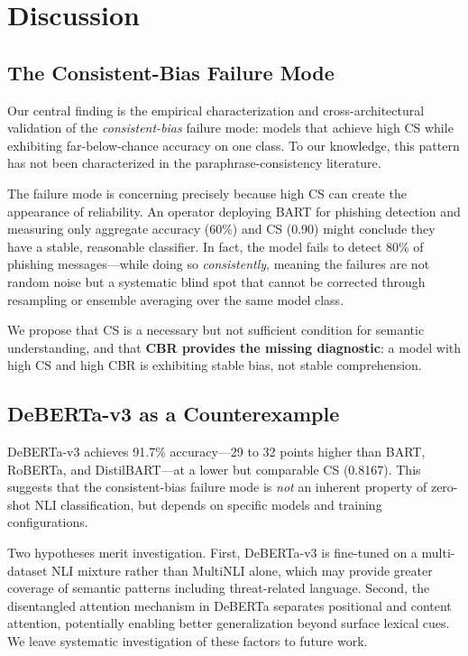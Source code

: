 \documentclass[11pt]{article}
\begin{document}
\section{Discussion}

\subsection{The Consistent-Bias Failure Mode}

Our central finding is the empirical characterization and cross-architectural validation of the \textit{consistent-bias} failure mode: models that achieve high CS while exhibiting far-below-chance accuracy on one class. To our knowledge, this pattern has not been characterized in the paraphrase-consistency literature.

The failure mode is concerning precisely because high CS can create the appearance of reliability. An operator deploying BART for phishing detection and measuring only aggregate accuracy (60\%) and CS (0.90) might conclude they have a stable, reasonable classifier. In fact, the model fails to detect 80\% of phishing messages---while doing so \textit{consistently}, meaning the failures are not random noise but a systematic blind spot that cannot be corrected through resampling or ensemble averaging over the same model class.

We propose that CS is a necessary but not sufficient condition for semantic understanding, and that \textbf{CBR provides the missing diagnostic}: a model with high CS and high CBR is exhibiting stable bias, not stable comprehension.

\subsection{DeBERTa-v3 as a Counterexample}

DeBERTa-v3 achieves 91.7\% accuracy---29 to 32 points higher than BART, RoBERTa, and DistilBART---at a lower but comparable CS (0.8167). This suggests that the consistent-bias failure mode is \textit{not} an inherent property of zero-shot NLI classification, but depends on specific models and training configurations. 

Two hypotheses merit investigation. First, DeBERTa-v3 is fine-tuned on a multi-dataset NLI mixture rather than MultiNLI alone, which may provide greater coverage of semantic patterns including threat-related language. Second, the disentangled attention mechanism in DeBERTa \citep{he2021deberta} separates positional and content attention, potentially enabling better generalization beyond surface lexical cues. We leave systematic investigation of these factors to future work.
\end{document}
